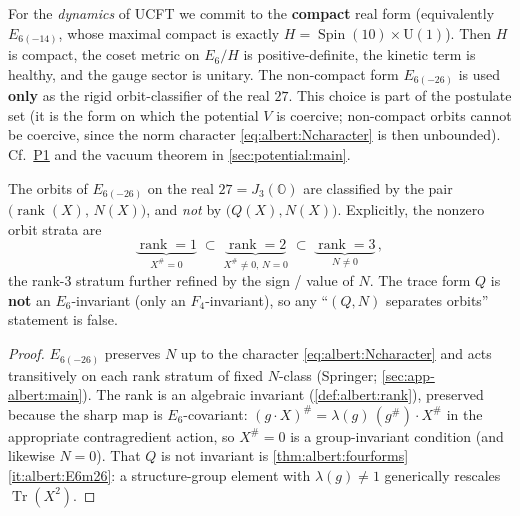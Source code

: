 \begin{postulate}\label{post:albert:realform}
For the \emph{dynamics} of UCFT we commit to the \textbf{compact} real
form (equivalently $E_{6(-14)}$, whose maximal compact is exactly
$H=\operatorname{Spin}(10)\times\mathrm{U}(1)$). Then $H$ is compact, the
coset metric on $E_{6}/H$ is positive-definite, the kinetic term is
healthy, and the gauge sector is unitary. The non-compact form
$E_{6(-26)}$ is used \textbf{only} as the rigid orbit-classifier of the
real $27$. This choice is part of the postulate set (it is the form on
which the potential $V$ is coercive; non-compact orbits cannot be
coercive, since the norm character \eqref{eq:albert:Ncharacter} is then
unbounded). Cf.\ \hyperref[post:potential:P1]{P1} and the vacuum theorem
in \autoref{sec:potential:main}.
\end{postulate}

\begin{theorem}\label{thm:albert:orbits}
\label{thm:OrbitClass}
The orbits of $E_{6(-26)}$ on the real $27=J_{3}(\mathbb{O})$ are
classified by the pair $\bigl(\operatorname{rank}(X),\,N(X)\bigr)$, and
\emph{not} by $\bigl(Q(X),N(X)\bigr)$. Explicitly, the nonzero orbit
strata are
\begin{equation}\label{eq:albert:orbitstrata}
  \underbrace{\operatorname{rank}=1}_{X^{\#}=0}\;\subset\;
  \underbrace{\operatorname{rank}=2}_{X^{\#}\neq 0,\,N=0}\;\subset\;
  \underbrace{\operatorname{rank}=3}_{N\neq 0}\,,
\end{equation}
the rank-$3$ stratum further refined by the sign / value of $N$. The
trace form $Q$ is \textbf{not} an $E_{6}$-invariant (only an
$F_{4}$-invariant), so any ``$(Q,N)$ separates orbits'' statement is
false.
\end{theorem}

\begin{proof}
$E_{6(-26)}$ preserves $N$ up to the character
\eqref{eq:albert:Ncharacter} and acts transitively on each rank stratum
of fixed $N$-class (Springer; \autoref{sec:app-albert:main}). The rank is an
algebraic invariant (\autoref{def:albert:rank}), preserved because the
sharp map is $E_{6}$-covariant: $(g\cdot X)^{\#}=\lambda(g)\,
(g^{\#})\!\cdot X^{\#}$ in the appropriate contragredient action, so
$X^{\#}=0$ is a group-invariant condition (and likewise $N=0$). That $Q$
is not invariant is \autoref{thm:albert:fourforms}\ref{it:albert:E6m26}:
a structure-group element with $\lambda(g)\neq1$ generically rescales
$\operatorname{Tr}(X^{2})$.
\end{proof}

